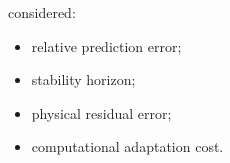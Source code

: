 considered: \begin{itemize} \item relative prediction error; \item stability horizon; \item physical residual error; \item computational adaptation cost. \end{itemize} %